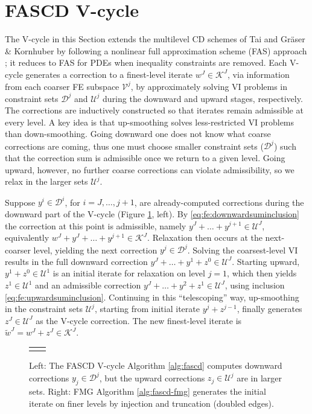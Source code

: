 \documentclass[review,hidelinks,onefignum,onetabnum,final]{siamart220329}  %
\begin{document}
\section{FASCD V-cycle} \label{sec:vcycle}

The V-cycle in this Section extends the multilevel CD schemes of Tai \cite{Tai2003} and Gr\"aser \& Kornhuber \cite[Algorithm 4.2]{GraeserKornhuber2009} by following a nonlinear full approximation scheme (FAS) approach \cite{BrandtLivne2011}; it reduces to FAS for PDEs when inequality constraints are removed.  Each V-cycle generates a correction to a finest-level iterate $w^J \in \mathcal{K}^J$, via information from each coarser FE subspace $\mathcal{V}^j$, by approximately solving VI problems in constraint sets $\mathcal{D}^j$ and $\mathcal{U}^j$ during the downward and upward stages, respectively.  The corrections are inductively constructed so that iterates remain admissible at every level.  A key idea is that up-smoothing solves less-restricted VI problems than down-smoothing.  Going downward one does not know what coarse corrections are coming, thus one must choose smaller constraint sets ($\mathcal{D}^j$) such that the correction sum is admissible once we return to a given level.  Going upward, however, no further coarse corrections can violate admissibility, so we relax in the larger sets $\mathcal{U}^j$.

Suppose $y^i \in \mathcal{D}^i$, for $i=J,\dots,j+1$, are already-computed corrections during the downward part of the V-cycle (Figure \ref{fig:fascdcycles}, left).  By \eqref{eq:fe:downwardsuminclusion} the correction at this point is admissible, namely $y^J + \dots + y^{j+1} \in \mathcal{U}^J$, equivalently $w^J + y^J + \dots + y^{j+1} \in \mathcal{K}^J$.  Relaxation then occurs at the next-coarser level, yielding the next correction $y^j \in \mathcal{D}^j$.  Solving the coarsest-level VI results in the full downward correction $y^J + \dots + y^1 + z^0 \in \mathcal{U}^J$.  Starting upward, $y^1 + z^0 \in \mathcal{U}^1$ is an initial iterate for relaxation on level $j=1$, which then yields $z^1 \in \mathcal{U}^1$ and an admissible correction $y^J + \dots + y^2 + z^1 \in \mathcal{U}^J$, using inclusion \eqref{eq:fe:upwardsuminclusion}.  Continuing in this ``telescoping'' way, up-smoothing in the constraint sets $\mathcal{U}^j$, starting from initial iterate $y^j+z^{j-1}$, finally generates $z^J\in \mathcal{U}^J$ as the V-cycle correction.  The new finest-level iterate is $\tilde{w}^J = w^J + z^J \in \mathcal{K}^J$.

\begin{figure}[ht]
\centering
\begin{tabular}{cc}

&

\end{tabular}
\caption{Left: The FASCD V-cycle Algorithm \ref{alg:fascd} computes downward corrections $y_j \in \mathcal{D}^j$, but the upward corrections $z_j\in\mathcal{U}^j$ are in larger sets. Right: FMG Algorithm \ref{alg:fascd-fmg} generates the initial iterate on finer levels by injection and truncation (doubled edges).}
\label{fig:fascdcycles}
\end{figure}
\end{document}

